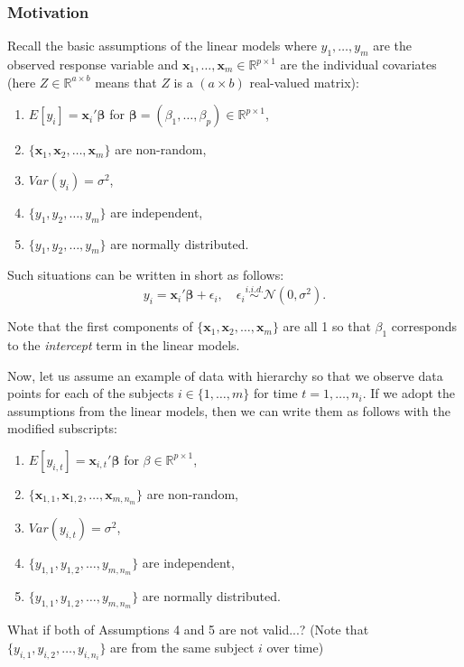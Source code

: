 \documentclass[ignorenonframetext,]{beamer}
\begin{document}
\begin{frame}[allowframebreaks]
\frametitle{Motivation}

Recall the basic assumptions of the linear models where $y_1,\ldots,y_m$ are the observed response variable and $\mathbf{x}_1,\ldots, \mathbf{x}_m \in \mathbb{R}^{p \times 1}$ are the individual covariates  (here $Z \in \mathbb{R}^{a \times b}$ means that $Z$ is a $(a \times b)$ real-valued matrix):
\begin{enumerate}
	\item $E[y_i] = \mathbf{x}_i' \bm{\beta}$ for $\bm{\beta} = (\beta_1, \ldots, \beta_p) \in \mathbb{R}^{p\times 1}$,
	\item $ \{\mathbf{x}_1, \mathbf{x}_2, \ldots, \mathbf{x}_m \}$ are non-random,
	\item $Var(y_i) = \sigma^2$,
	\item $\{ y_1, y_2, \ldots, y_m  \}$ are independent,
	\item $\{ y_1, y_2, \ldots, y_m  \}$ are normally distributed.
\end{enumerate}
Such situations can be written in short as follows:
\begin{equation} \label{p1:linmod}
y_i = \mathbf{x}_i' \bm{\beta}  + \epsilon_i, \quad \epsilon_i \overset{i.i.d.}\sim \mathcal{N}(0, \sigma^2).
\end{equation}

Note that the first components of $ \{\mathbf{x}_1, \mathbf{x}_2, \ldots, \mathbf{x}_m \}$ are all 1 so that $\beta_1$ corresponds to the \emph{intercept} term in the linear models.

\framebreak

Now, let us assume an example of data with hierarchy so that we observe data points for each of the subjects $i \in \{1,\ldots, m\}$ for time $t=1,\ldots, n_i$. If we adopt the assumptions from the linear models, then we can write them as follows with the modified subscripts:
\begin{enumerate}
	\item $E[y_{i,t}] = \mathbf{x}_{i,t}' \bm{\beta}$ for $\beta \in \mathbb{R}^{p \times 1}$,
	\item $ \{\mathbf{x}_{1,1}, \mathbf{x}_{1,2}, \ldots, \mathbf{x}_{m,n_m} \}$ are non-random,
	\item $Var(y_{i,t}) = \sigma^2$,
	\item {\color{red} $\{ y_{1,1}, y_{1,2}, \ldots, y_{m,n_m}  \}$ are independent,}
	\item {\color{red} $\{  y_{1,1}, y_{1,2}, \ldots, y_{m,n_m}   \}$ are normally distributed.}
\end{enumerate}
What if both of Assumptions 4 and 5 are not valid...? (Note that $\{ y_{i,1}, y_{i,2}, \ldots, y_{i,n_i}  \}$ are from the same subject $i$ over time)


\end{frame}
\end{document}
